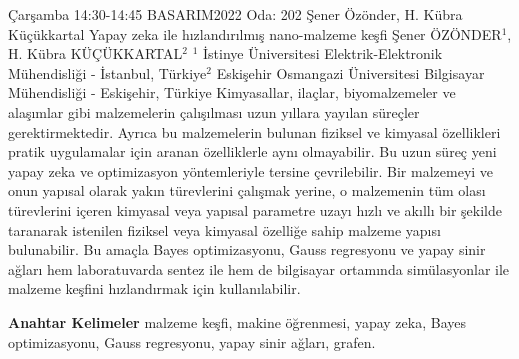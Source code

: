 
    \begin{abstract_basarim}
    {Çarşamba 14:30-14:45}
    {BASARIM2022}
    {Oda: 202}
    {Şener Özönder, H. Kübra Küçükkartal}
    {Yapay zeka ile hızlandırılmış nano-malzeme keşfi}
    {%
    Şener ÖZÖNDER$^{1}$, H. Kübra KÜÇÜKKARTAL$^{2}$}
    {%
    }
    {%
    $^1$ İstinye Üniversitesi Elektrik-Elektronik Mühendisliği - İstanbul, Türkiye\newline{}$^2$ Eskişehir Osmangazi Üniversitesi Bilgisayar Mühendisliği - Eskişehir, Türkiye}
    Kimyasallar, ilaçlar, biyomalzemeler ve alaşımlar gibi malzemelerin çalışılması uzun yıllara yayılan süreçler gerektirmektedir. Ayrıca bu malzemelerin bulunan fiziksel ve kimyasal özellikleri pratik uygulamalar için aranan özelliklerle aynı olmayabilir. Bu uzun süreç yeni yapay zeka ve optimizasyon yöntemleriyle tersine çevrilebilir. Bir malzemeyi ve onun yapısal olarak yakın türevlerini çalışmak yerine, o malzemenin tüm olası türevlerini içeren kimyasal veya yapısal parametre uzayı hızlı ve akıllı bir şekilde taranarak istenilen fiziksel veya kimyasal özelliğe sahip malzeme yapısı bulunabilir. Bu amaçla Bayes optimizasyonu, Gauss regresyonu ve yapay sinir ağları hem laboratuvarda sentez ile hem de bilgisayar ortamında simülasyonlar ile malzeme keşfini hızlandırmak için kullanılabilir. 
    
            \textbf{Anahtar Kelimeler} \newline{}malzeme keşfi, makine öğrenmesi, yapay zeka, Bayes optimizasyonu, Gauss regresyonu, yapay sinir ağları, grafen.
    \end{abstract_basarim}
    